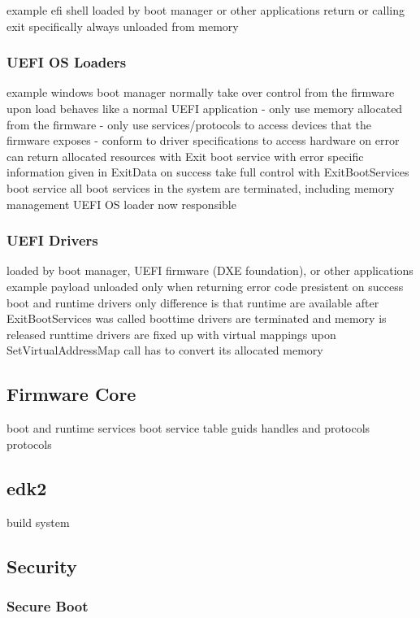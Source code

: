 example efi shell
loaded by boot manager or other applications
return or calling exit specifically
always unloaded from memory

\subsubsection{UEFI OS Loaders}

example windows boot manager
normally take over control from the firmware
upon load behaves like a normal UEFI application
- only use memory allocated from the firmware
- only use services/protocols to access devices that the firmware exposes
- conform to driver specifications to access hardware
on error can return allocated resources with Exit boot service with error specific information given in ExitData
on success take full control with ExitBootServices boot service
all boot services in the system are terminated, including memory management
UEFI OS loader now responsible

\subsubsection{UEFI Drivers}

loaded by boot manager, UEFI firmware (DXE foundation), or other applications
example payload
unloaded only when returning error code
presistent on success
boot and runtime drivers
only difference is that runtime are available after ExitBootServices was called
boottime drivers are terminated and memory is released
runttime drivers are fixed up with virtual mappings upon SetVirtualAddressMap call
has to convert its allocated memory

\subsection{Firmware Core}

boot and runtime services
boot service table
guids
handles and protocols
protocols

\subsection{edk2}
build system

\subsection{Security}
\subsubsection{Secure Boot}
